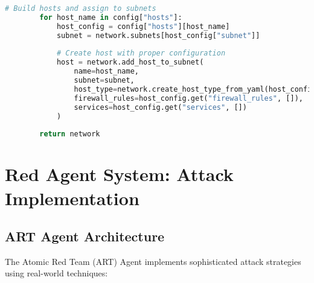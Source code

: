 \documentclass[12pt,a4paper]{article}
\begin{document}
\begin{lstlisting}[language=Python, caption=Network Base Implementation]
        # Build hosts and assign to subnets
        for host_name in config["hosts"]:
            host_config = config["hosts"][host_name]
            subnet = network.subnets[host_config["subnet"]]
            
            # Create host with proper configuration
            host = network.add_host_to_subnet(
                name=host_name,
                subnet=subnet,
                host_type=network.create_host_type_from_yaml(host_config.get("type")),
                firewall_rules=host_config.get("firewall_rules", []),
                services=host_config.get("services", [])
            )
        
        return network
\end{lstlisting}

\section{Red Agent System: Attack Implementation}

\subsection{ART Agent Architecture}

The Atomic Red Team (ART) Agent implements sophisticated attack strategies using real-world techniques:
\end{document}
